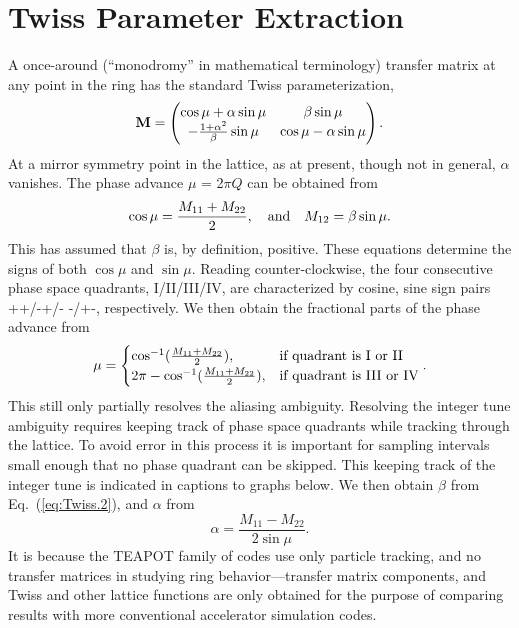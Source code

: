 \documentclass[12pt]{article}
\begin{document}
\section{Twiss Parameter Extraction}
A once-around (``monodromy'' in mathematical terminology) 
transfer matrix at any point in the ring has the standard Twiss parameterization,
%
\begin{equation}
{\bf{M}} =
  \begin{pmatrix}
           \cos\mu + \alpha \sin\mu &            \beta \sin\mu \\
   -\frac{1+\alpha^2}{\beta}\sin\mu & \cos\mu - \alpha \sin\mu
  \end{pmatrix}.
\label{eq:Twiss.1}
\end{equation}
%
At a mirror symmetry point in the lattice, as at present, though not in general, $\alpha$ vanishes.
The phase advance $\mu$ = 2$\pi Q$ can be obtained from
%
\begin{equation}
 \cos\mu=\frac{M_{11}+M_{22}}{2}, \quad \hbox{and} \quad M_{12}=\beta \sin\mu.
\label{eq:Twiss.2}
\end{equation}
%
This has assumed that $\beta$ is, by definition, positive.
These equations determine the signs of both $\cos\mu$ and $\sin\mu$. Reading counter-clockwise, the four 
consecutive phase space quadrants, I/II/III/IV, are characterized by cosine, sine sign pairs 
++/-+/- -/+-, respectively. We then obtain the fractional parts of the phase advance from 
%
\begin{equation}
 \mu = 
\begin{cases} 
       \cos^{-1}( \frac{M_{11}+M_{22}}{2} ), & \mbox{if } \textnormal{quadrant}\mbox{ is I or II} \\ 
  2\pi-\cos^{-1}( \frac{M_{11}+M_{22}}{2} ), & \mbox{if } \textnormal{quadrant}\mbox{ is III or IV} \end{cases}.
\label{eq:Twiss.3}
\end{equation}
%
This still only partially resolves the aliasing ambiguity. Resolving the integer tune ambiguity requires 
keeping track of phase space quadrants while tracking through the lattice. To avoid error in this
process it is important for sampling intervals small enough that no phase quadrant can be skipped.
This keeping track of the integer tune is indicated in captions 
to graphs below. We then obtain $\beta$ from Eq.~(\ref{eq:Twiss.2}), and $\alpha$ from 
%
\begin{equation}
 \alpha=\frac{M_{11}-M_{22}}{2\sin\mu}.
\label{eq:Twiss.4}
\end{equation}
%
It is because the TEAPOT family of codes use only particle tracking, and no transfer matrices in
studying ring behavior---transfer matrix components, and Twiss and other lattice functions are only 
obtained for the purpose of comparing results with more conventional accelerator simulation codes.
\end{document}
